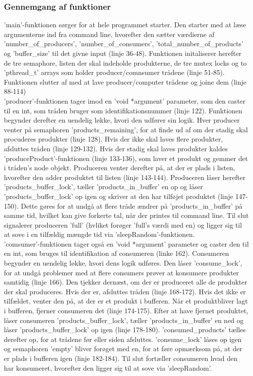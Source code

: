 {\subsubsection{Gennemgang af funktioner}
\label{O3_Funktioner}
'main'-funktionen sørger for at hele programmet starter. Den starter med at læse argumenterne ind fra command line, hvorefter den sætter værdierne af 'number_of_producers', 'number_of_consumers', 'total_number_of_products' og 'buffer_size' til det givne input (linje 36-48). Funktionen initaliserer herefter de tre semaphore, listen der skal indeholde produkterne, de tre mutex locks og to 'pthread_t' arrays som holder producer/comnsumer trådene (linje 51-85). Funktionen slutter af med at lave producer/computer trådene og joine dem (linje 88-114)
\\ 'producer'-funktionen tager imod en 'void *argument' parameter, som den caster til en int, som tråden bruger som identifikationsnummer (linje 122). Funktionen begynder derefter en uendelig løkke, hvori den udfører sin logik. Hver producer venter på semaphoren 'products_remaining', for at finde ud af om der stadig skal procuderes produkter (linje 128). Hvis der ikke skal laves flere produkter, afsluttes tråden (linje 129-132). Hvis der stadig skal laves produkter kaldes 'produceProduct'-funktionen (linje 133-136), som laver et produkt og gemmer det i tråden's node objekt. Produceren venter derefter på, at der er plads i listen, hvorefter den adder produktet til listen (linje 143-144). Produceren låser herefter 'products_buffer_lock', tæller 'products_in_buffer' en op og låser 'products_buffer_lock' op igen og skriver at den har tilføjet produktet (linje 147-150). Dette gøres for at undgå at flere tråde ændrer på 'products_in_buffer' på samme tid, hvilket kan give forkerte tal, når der printes til command line. Til slut signalerer produceren 'full' (hvliket forøger 'full's værdi med en) og ligger sig til at sove i en tilfældig mængde tid via 'sleepRandom'-funktionen.
\\ 'comsumer'-funktionen tager også en 'void *argument' parameter og caster den til en int, som bruges til identifikation af consumeren (linke 162). Consumeren begynder en uendelig løkke, hvori dens logik udføres. Den låser 'consume_lock', for at undgå problemer med at flere consumers prøver at konsumere produkter samtidig (linje 166). Den tjekker dernæst, om der er produceret alle de produkter der skal produceres. Hvis der er, afsluttes tråden (linje 168-172). Hvis det ikke er tilfældet, venter den på, at der er et produkt i bufferen. Når et produktbliver lagt i bufferen, fjerner consumeren det (linje 174-175). Efter at have fjernet produktet, låser consumeren 'products_buffer_lock', tæller 'products_in_buffer' en ned og låser 'products_buffer_lock' op igen (linje 178-180). 'consumed_products' tælles derefter op, for at trådene før eller siden afsluttes. 'consume_lock' låses op igen og semaphoren 'empty' bliver forøget med en, for at føre opmærksom på, at der er plads i bufferen igen (linje 182-184). Til slut fortæller consumeren hvad den har konsumeret, hvorefter den ligger sig til at sove via 'sleepRandom'.
}
